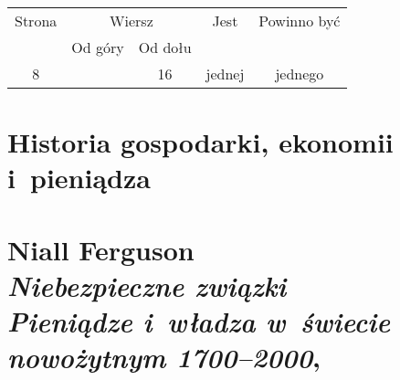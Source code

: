 \documentclass[a4paper,11pt]{article}
\numberwithin{equation}{section}
\begin{document}
\begin{center}

  \begin{tabular}{|c|c|c|c|c|}
    \hline
    Strona & \multicolumn{2}{c|}{Wiersz} & Jest
                              & Powinno być \\ \cline{2-3}
    & Od góry & Od dołu & & \\
    \hline
    8   & & 16 & jednej & jednego \\
    \hline
  \end{tabular}

\end{center}

\VerSpaceTwo












\newpage

\section{Historia gospodarki, ekonomii i~pieniądza}


\VerSpaceTwo



\section{Niall Ferguson \\
  \textit{Niebezpieczne związki} \\
  \textit{Pieniądze i~władza w~świecie nowożytnym 1700--2000},
  \cite{FergusonNiebezpieczneZwiazki2015}}


\vspace{0em}
\end{document}
